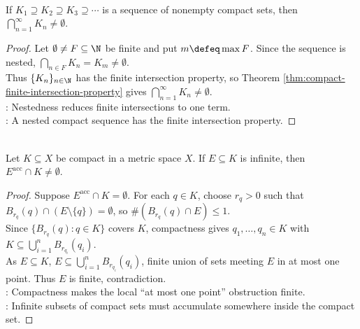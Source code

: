 \begin{corollary} \label{cor:nested-nonempty-compact-intersection} \\
If $K_1\supseteq K_2\supseteq K_3\supseteq\cdots$ is a sequence of nonempty compact sets, then $\bigcap_{n=1}^{\infty}K_n\neq\emptyset$.
\begin{proof}
Let $\emptyset\neq F\subseteq\N$ be finite and put $m\defeq\max F$. Since the sequence is nested, $\bigcap\limits_{n\in F}K_n=K_m\neq\emptyset$.\\
Thus $\{K_n\}_{n\in\N}$ has the finite intersection property, so Theorem \ref{thm:compact-finite-intersection-property} gives $\bigcap\limits_{n=1}^{\infty}K_n\neq\emptyset$.\\
: Nestedness reduces finite intersections to one term.\\
: A nested compact sequence has the finite intersection property.
\end{proof}
\end{corollary}

\begin{theorem} \label{thm:infinite-subset-of-compact-has-limit-point} \\
Let $K\subseteq X$ be compact in a metric space $X$. If $E\subseteq K$ is infinite, then $E^{\operatorname{acc}}\cap K\neq\emptyset$.
\begin{proof}
Suppose $E^{\operatorname{acc}}\cap K=\emptyset$. For each $q\in K$, choose $r_q>0$ such that $B_{r_q}(q)\cap(E\setminus\{q\})=\emptyset$, so $\#(B_{r_q}(q)\cap E)\leq1$.\\
Since $\{B_{r_q}(q):q\in K\}$ covers $K$, compactness gives $q_1,\ldots,q_n\in K$ with $K\subseteq\bigcup\limits_{i=1}^{n}B_{r_{q_i}}(q_i)$.\\
As $E\subseteq K$, $E\subseteq\bigcup\limits_{i=1}^{n}B_{r_{q_i}}(q_i)$, finite union of sets meeting $E$ in at most one point. Thus $E$ is finite, contradiction.\\
: Compactness makes the local ``at most one point'' obstruction finite.\\
: Infinite subsets of compact sets must accumulate somewhere inside the compact set.
\end{proof}
\end{theorem}
